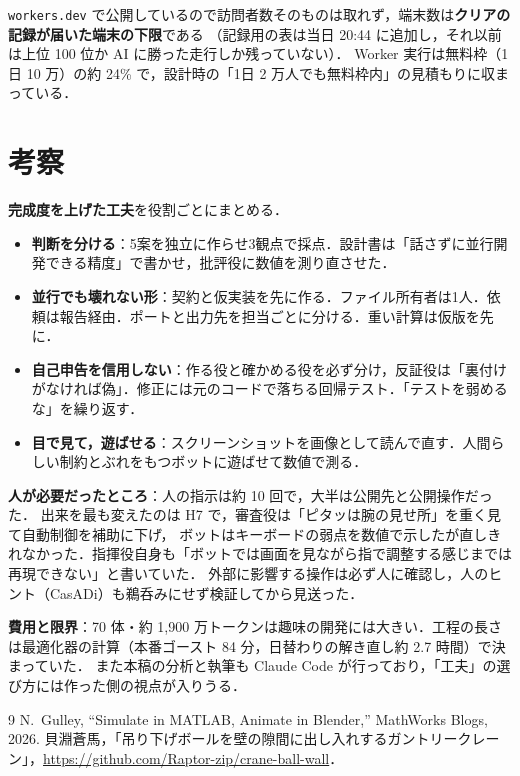 \documentclass[a4paper,twocolumn,10pt]{ltjsarticle}
\begin{document}
\texttt{workers.dev} で公開しているので訪問者数そのものは取れず，端末数は\textbf{クリアの記録が届いた端末の下限}である
（記録用の表は当日 20:44 に追加し，それ以前は上位 100 位か AI に勝った走行しか残っていない）．
Worker 実行は無料枠（1日 10 万）の約 24\% で，設計時の「1日 2 万人でも無料枠内」の見積もりに収まっている．

\section{考察}
\textbf{完成度を上げた工夫}を役割ごとにまとめる．
\begin{itemize}
  \item \textbf{判断を分ける}：5案を独立に作らせ3観点で採点．設計書は「話さずに並行開発できる精度」で書かせ，批評役に数値を測り直させた．
  \item \textbf{並行でも壊れない形}：契約と仮実装を先に作る．ファイル所有者は1人．依頼は報告経由．ポートと出力先を担当ごとに分ける．重い計算は仮版を先に．
  \item \textbf{自己申告を信用しない}：作る役と確かめる役を必ず分け，反証役は「裏付けがなければ偽」．修正には元のコードで落ちる回帰テスト．「テストを弱めるな」を繰り返す．
  \item \textbf{目で見て，遊ばせる}：スクリーンショットを画像として読んで直す．人間らしい制約とぶれをもつボットに遊ばせて数値で測る．
\end{itemize}
\textbf{人が必要だったところ}：人の指示は約 10 回で，大半は公開先と公開操作だった．
出来を最も変えたのは H7 で，審査役は「ピタッは腕の見せ所」を重く見て自動制御を補助に下げ，
ボットはキーボードの弱点を数値で示したが直しきれなかった．指揮役自身も「ボットでは画面を見ながら指で調整する感じまでは再現できない」と書いていた．
外部に影響する操作は必ず人に確認し，人のヒント（CasADi）も鵜呑みにせず検証してから見送った．

\textbf{費用と限界}：70 体・約 1,900 万トークンは趣味の開発には大きい．工程の長さは最適化器の計算（本番ゴースト 84 分，日替わりの解き直し約 2.7 時間）で決まっていた．
また本稿の分析と執筆も Claude Code が行っており，「工夫」の選び方には作った側の視点が入りうる．

\begin{thebibliography}{9}
\setlength{\itemsep}{0pt}
\footnotesize
{} N.~Gulley, ``Simulate in MATLAB, Animate in Blender,'' MathWorks Blogs, 2026.
 貝淵蒼馬，「吊り下げボールを壁の隙間に出し入れするガントリークレーン」，\url{https://github.com/Raptor-zip/crane-ball-wall}．
\end{thebibliography}
\end{document}
